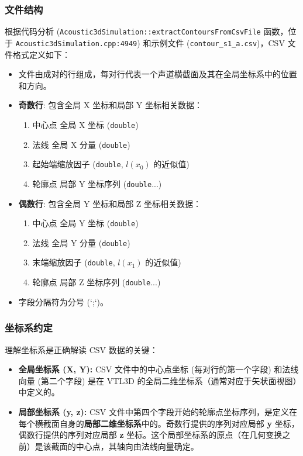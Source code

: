 \documentclass{ctexart}
\begin{document}
\subsubsection{文件结构}
根据代码分析 (\texttt{Acoustic3dSimulation::extractContoursFromCsvFile} 函数，位于 \texttt{Acoustic3dSimulation.cpp:4949}) 和示例文件 (\texttt{contour\_s1\_a.csv})，CSV 文件格式定义如下：
\begin{itemize}
    \item 文件由成对的行组成，每对行代表一个声道横截面及其在全局坐标系中的位置和方向。
    \item \textbf{奇数行}: 包含全局 X 坐标和局部 Y 坐标相关数据：
        \begin{enumerate}
            \item 中心点 全局 X 坐标 (\texttt{double})
            \item 法线 全局 X 分量 (\texttt{double})
            \item 起始端缩放因子 (\texttt{double}, \(l(x_0)\) 的近似值)
            \item 轮廓点 局部 Y 坐标序列 (\texttt{double}...)
        \end{enumerate}
    \item \textbf{偶数行}: 包含全局 Y 坐标和局部 Z 坐标相关数据：
        \begin{enumerate}
            \item 中心点 全局 Y 坐标 (\texttt{double})
            \item 法线 全局 Y 分量 (\texttt{double})
            \item 末端缩放因子 (\texttt{double}, \(l(x_1)\) 的近似值)
            \item 轮廓点 局部 Z 坐标序列 (\texttt{double}...)
        \end{enumerate}
    \item 字段分隔符为分号 (`;`)。
\end{itemize}

\subsubsection{坐标系约定}
理解坐标系是正确解读 CSV 数据的关键：
\begin{itemize}
    \item \textbf{全局坐标系 (X, Y):} CSV 文件中的中心点坐标 (每对行的第一个字段) 和法线向量 (第二个字段) 是在 VTL3D 的全局二维坐标系（通常对应于矢状面视图）中定义的。
    \item \textbf{局部坐标系 (y, z):} CSV 文件中第四个字段开始的轮廓点坐标序列，是定义在每个横截面自身的\textbf{局部二维坐标系}中的。奇数行提供的序列对应局部 \textbf{y} 坐标，偶数行提供的序列对应局部 \textbf{z} 坐标。这个局部坐标系的原点（在几何变换之前）是该截面的中心点，其轴向由法线向量确定。
\end{itemize}
\end{document}
